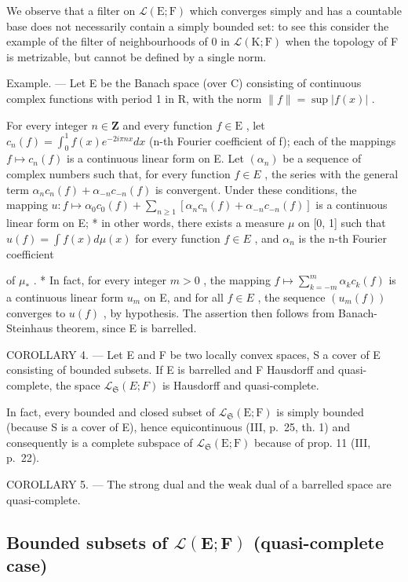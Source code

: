 We observe that a filter on \(\mathcal{L}(\mathrm{E};\mathrm{F})\) which converges simply and has a countable base does not necessarily contain a simply bounded set: to see this consider the example of the filter of neighbourhoods of 0 in \(\mathcal{L}(\mathrm{K};\mathrm{F})\) when the topology of F is metrizable, but cannot be defined by a single norm.

Example. --- Let E be the Banach space (over C) consisting of continuous complex functions with period 1 in R, with the norm \(\|f\| = \sup |f(x)|\) .

For every integer \(n \in \mathbf{Z}\) and every function \(f \in \mathrm{E}\) , let \(c_{n}(f) = \int_{0}^{1} f(x)e^{-2i\pi nx} dx\) (n-th Fourier coefficient of f); each of the mappings \(f \mapsto c_{n}(f)\) is a continuous linear form on E. Let \((\alpha_{n})\) be a sequence of complex numbers such that, for every function \(f \in E\) , the series with the general term \(\alpha_{n}c_{n}(f) + \alpha_{-n}c_{-n}(f)\) is convergent. Under these conditions, the mapping \(u: f \mapsto \alpha_{0}c_{0}(f) + \sum_{n \geqslant 1} [\alpha_{n}c_{n}(f) + \alpha_{-n}c_{-n}(f)]\) is a continuous linear form on E; * in other words, there exists a measure \(\mu\) on {[}0, 1{]} such that \(u(f) = \int f(x) d\mu(x)\) for every function \(f \in E\) , and \(\alpha_{n}\) is the n-th Fourier coefficient

of \(\mu_{*}\) . * In fact, for every integer \(m > 0\) , the mapping \(f \mapsto \sum_{k = -m}^{m} \alpha_k c_k(f)\) is a continuous linear form \(u_{m}\) on E, and for all \(f \in E\) , the sequence \((u_{m}(f))\) converges to \(u(f)\) , by hypothesis. The assertion then follows from Banach-Steinhaus theorem, since E is barrelled.

COROLLARY 4. --- Let E and F be two locally convex spaces, S a cover of E consisting of bounded subsets. If E is barrelled and F Hausdorff and quasi-complete, the space \(\mathcal{L}_{\mathfrak{S}}(E;F)\) is Hausdorff and quasi-complete.

In fact, every bounded and closed subset of \(\mathcal{L}_{\mathfrak{S}}(\mathrm{E};\mathrm{F})\) is simply bounded (because S is a cover of E), hence equicontinuous (III, p.~25, th. 1) and consequently is a complete subspace of \(\mathcal{L}_{\mathfrak{S}}(\mathrm{E};\mathrm{F})\) because of prop. 11 (III, p.~22).

COROLLARY 5. --- The strong dual and the weak dual of a barrelled space are quasi-complete.

\subsection{\texorpdfstring{Bounded subsets of \(\mathcal{L}(\mathbf{E};\mathbf{F})\) (quasi-complete case)}{Bounded subsets of \textbackslash mathcal\{L\}(\textbackslash mathbf\{E\};\textbackslash mathbf\{F\}) (quasi-complete case)}}

